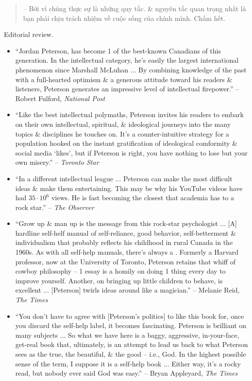 \documentclass{article}
\begin{document}
\begin{enumerate}
\begin{quotation}
		-- Bởi vì chúng thực sự là những quy tắc. \& nguyên tắc quan trọng nhất là bạn phải chịu trách nhiệm về cuộc sống của chính mình. Chấm hết.
	\end{quotation}
	{\sf Editorial review.}
	\begin{itemize}
		\item ``{\sc Jordan Peterson}, has become 1 of the best-known Canadians of this generation. In the intellectual category, he's easily the largest international phenomenon since {\sc Marshall McLuhan} $\ldots$ By combining knowledge of the past with a full-hearted optimism \& a generous attitude toward his readers \& listeners, {\sc Peterson} generates an impressive level of intellectual firepower.'' -- {\sc Robert Fulford}, {\it National Post}
		\item ``Like the best intellectual polymaths, {\sc Peterson} invites his readers to embark on their own intellectual, spiritual, \& ideological journeys into the many topics \& disciplines he touches on. It's a counter-intuitive strategy for a population hooked on the instant gratification of ideological comformity \& social media `likes', but if {\sc Peterson} is right, you have nothing to lose but your own misery.'' -- {\it Toronto Star}
		\item ``In a different intellectual league $\ldots$ {\sc Peterson} can make the most difficult ideas \& make them entertaining. This may be why his YouTube videos have had $35\cdot10^6$ views. He is fast becoming the closest that academia has to a rock star.'' -- {\it The Observer}
		\item ``Grow up \& man up is the message from this rock-star psychologist $\ldots$ [A] hardline self-helf manual of self-reliance, good behavior, self-betterment \& individualism that probably reflects his childhood in rural Canada in the 1960s. As with all self-help manuals, there's always a . Formerly a Harvard professor, now at the University of Toronto, {\sc Peterson} retains that whiff of cowboy philosophy -- 1 essay is a homily on doing 1 thing every day to improve yourself. Another, on bringing up little children to behave, is excellent $\ldots$ [{\sc Peterson}] twirls ideas around like a magician.'' -- {\sc Melanie Reid}, {\it The Times}
		\item ``You don't have to agree with [{\sc Peterson}'s politics] to like this book for, once you discard the self-help label, it becomes fascinating. {\sc Peterson} is brilliant on many subjects $\ldots$ So what we have here is a baggy, aggressive, in-your-face, get-real book that, ultimately, is an attempt to lead us back to what {\sc Peterson} sees as the true, the beautiful, \& the good -- i.e., God. In the highest possible sense of the term, I suppose it is a self-help book $\ldots$ Either way, it's a rocky read, but nobody ever said God was easy.'' -- {\sc Bryan Appleyard}, {\it The Times}

\end{itemize}
\end{enumerate}
\end{document}
